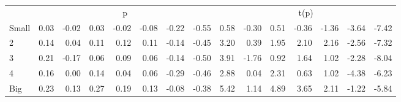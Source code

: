 \begin{table}[!ht]
\begin{tabular}{lrrrrrrrrrrrrrr}
  
     & \multicolumn{7}{c}{p} & \multicolumn{7}{c}{t(p)}   \\
     \cmidrule(r){2-8} \cmidrule(r){9-15} 
    Small  & 0.03  & -0.02  & 0.03  & -0.02  & -0.08  & -0.22  & -0.55  & 0.58  & -0.30  & 0.51  & -0.36  & -1.36  & -3.64  & -7.42   \\
    2  & 0.14  & 0.04  & 0.11  & 0.12  & 0.11  & -0.14  & -0.45  & 3.20  & 0.39  & 1.95  & 2.10  & 2.16  & -2.56  & -7.32   \\
    3  & 0.21  & -0.17  & 0.06  & 0.09  & 0.06  & -0.14  & -0.50  & 3.91  & -1.76  & 0.92  & 1.64  & 1.02  & -2.28  & -8.04   \\
    4  & 0.16  & 0.00  & 0.14  & 0.04  & 0.06  & -0.29  & -0.46  & 2.88  & 0.04  & 2.31  & 0.63  & 1.02  & -4.38  & -6.23   \\
    Big  & 0.23  & 0.13  & 0.27  & 0.19  & 0.13  & -0.08  & -0.38  & 5.42  & 1.14  & 4.89  & 3.65  & 2.11  & -1.22  & -5.84   \\
    
  
  \bottomrule
\end{tabular}
\label{tbl:25_Size_NI_B16}
\end{table}